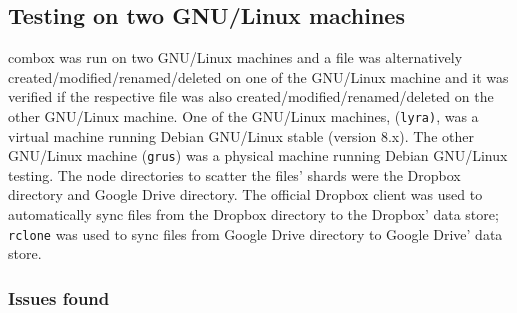 \subsection{Testing on two GNU/Linux machines}

combox was run on two GNU/Linux machines and a file was alternatively
created/modified/renamed/deleted on one of the GNU/Linux machine and
it was verified if the respective file was also
created/modified/renamed/deleted on the other GNU/Linux machine. One
of the GNU/Linux machines, (\verb+lyra)+, was a virtual machine
running Debian GNU/Linux stable (version 8.x). The other GNU/Linux
machine (\verb+grus+) was a physical machine running Debian GNU/Linux
testing. The node directories to scatter the files' shards were the
Dropbox directory and Google Drive directory. The official Dropbox
client was used to automatically sync files from the Dropbox directory
to the Dropbox' data store; \verb+rclone+ \cite{program:rclone} was
used to sync files from Google Drive directory to Google Drive' data
store.

\subsubsection{Issues found}\label{ch-4-2gnus-issues}

